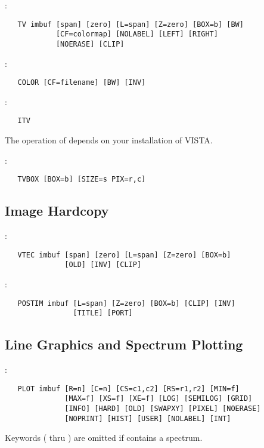 :
\begin{verbatim}
   TV imbuf [span] [zero] [L=span] [Z=zero] [BOX=b] [BW]
            [CF=colormap] [NOLABEL] [LEFT] [RIGHT]
            [NOERASE] [CLIP]
\end{verbatim}

\noindent {}:
\begin{verbatim}
   COLOR [CF=filename] [BW] [INV]
\end{verbatim}

\noindent {}:
\begin{verbatim}
   ITV
\end{verbatim}
The operation of  depends on your installation of VISTA.

\noindent {}:
\begin{verbatim}
   TVBOX [BOX=b] [SIZE=s PIX=r,c]
\end{verbatim}

\subsection{Image Hardcopy}

:
\begin{verbatim}
   VTEC imbuf [span] [zero] [L=span] [Z=zero] [BOX=b]
              [OLD] [INV] [CLIP]
\end{verbatim}

\noindent {}:
\begin{verbatim}
   POSTIM imbuf [L=span] [Z=zero] [BOX=b] [CLIP] [INV]
                [TITLE] [PORT]
\end{verbatim}

\subsection{Line Graphics and Spectrum Plotting}

:
\begin{verbatim}
   PLOT imbuf [R=n] [C=n] [CS=c1,c2] [RS=r1,r2] [MIN=f]
              [MAX=f] [XS=f] [XE=f] [LOG] [SEMILOG] [GRID]
              [INFO] [HARD] [OLD] [SWAPXY] [PIXEL] [NOERASE]
              [NOPRINT] [HIST] [USER] [NOLABEL] [INT]
\end{verbatim}
Keywords (\comm{[R=n]} thru \comm{[RS=r1,r2]}) are omitted if 
contains a spectrum.

